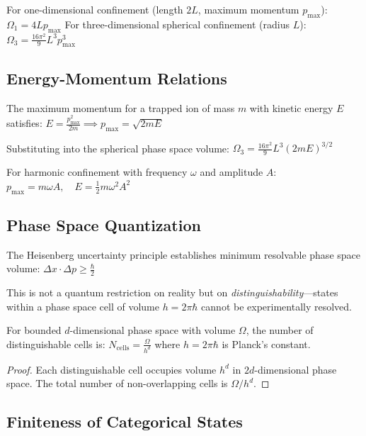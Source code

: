 \begin{example}
For one-dimensional confinement (length $2L$, maximum momentum $p_{\max}$):
$
\Omega_1 = 4Lp_{\max}
$
For three-dimensional spherical confinement (radius $L$):
$
\Omega_3 = \frac{16\pi^2}{9} L^3 p_{\max}^3
$
\end{example}

\subsection{Energy-Momentum Relations}

The maximum momentum for a trapped ion of mass $m$ with kinetic energy $E$ satisfies:
$
E = \frac{p_{\max}^2}{2m} \implies p_{\max} = \sqrt{2mE}
$

Substituting into the spherical phase space volume:
$
\Omega_3 = \frac{16\pi^2}{9} L^3 (2mE)^{3/2}
$

For harmonic confinement with frequency $\omega$ and amplitude $A$:
$
p_{\max} = m\omega A, \quad E = \frac{1}{2}m\omega^2 A^2
$

\subsection{Phase Space Quantization}

The Heisenberg uncertainty principle establishes minimum resolvable phase space volume:
$
\Delta x \cdot \Delta p \geq \frac{\hbar}{2}
$

This is not a quantum restriction on reality but on \emph{distinguishability}---states within a phase space cell of volume $h = 2\pi\hbar$ cannot be experimentally resolved.

\begin{lemma}
\label{lem:discretization}
For bounded $d$-dimensional phase space with volume $\Omega$, the number of distinguishable cells is:
$
N_{\mathrm{cells}} = \frac{\Omega}{h^d}
$
where $h = 2\pi\hbar$ is Planck's constant.
\end{lemma}

\begin{proof}
Each distinguishable cell occupies volume $h^d$ in $2d$-dimensional phase space. The total number of non-overlapping cells is $\Omega/h^d$.
\end{proof}

\subsection{Finiteness of Categorical States}

